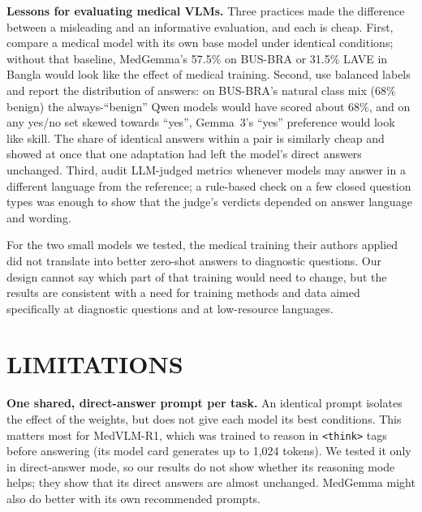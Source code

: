 \documentclass[doublecolumn]{ijcvsplatex}
\newcommand{\medvlm}{MedVLM-R1}
\newcommand{\gemma}{Gemma~3}
\newcommand{\medgemma}{MedGemma}
\begin{document}
\textbf{Lessons for evaluating medical VLMs.} Three practices made the difference between a misleading and an informative evaluation, and each is cheap. First, compare a medical model with its own base model under identical conditions; without that baseline, \medgemma{}'s 57.5\% on BUS-BRA or 31.5\% LAVE in Bangla would look like the effect of medical training. Second, use balanced labels and report the distribution of answers: on BUS-BRA's natural class mix (68\% benign) the always-``benign'' Qwen models would have scored about 68\%, and on any yes/no set skewed towards ``yes'', \gemma{}'s ``yes'' preference would look like skill. The share of identical answers within a pair is similarly cheap and showed at once that one adaptation had left the model's direct answers unchanged. Third, audit LLM-judged metrics whenever models may answer in a different language from the reference; a rule-based check on a few closed question types was enough to show that the judge's verdicts depended on answer language and wording.

For the two small models we tested, the medical training their authors applied did not translate into better zero-shot answers to diagnostic questions. Our design cannot say which part of that training would need to change, but the results are consistent with a need for training methods and data aimed specifically at diagnostic questions and at low-resource languages.

\section{LIMITATIONS}
\label{sec_limitations}

\textbf{One shared, direct-answer prompt per task.} An identical prompt isolates the effect of the weights, but does not give each model its best conditions. This matters most for \medvlm{}, which was trained to reason in \texttt{<think>} tags before answering (its model card generates up to 1,024 tokens). We tested it only in direct-answer mode, so our results do not show whether its reasoning mode helps; they show that its direct answers are almost unchanged. \medgemma{} might also do better with its own recommended prompts.

\end{document}
